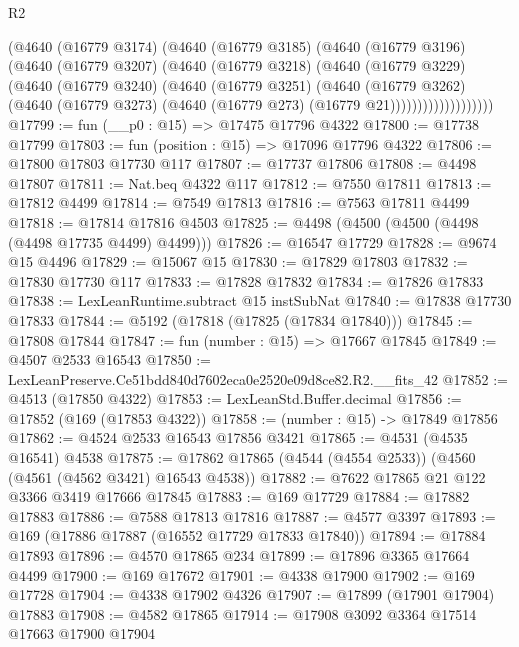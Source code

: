 \begin{lexlean}{R2}
\begin{coremodule}
                  (@4640
                    (@16779 @3174)
                    (@4640
                      (@16779 @3185)
                      (@4640
                        (@16779 @3196)
                        (@4640
                          (@16779 @3207)
                          (@4640
                            (@16779 @3218)
                            (@4640
                              (@16779 @3229)
                              (@4640
                                (@16779 @3240)
                                (@4640
                                  (@16779 @3251)
                                  (@4640
                                    (@16779 @3262)
                                    (@4640
                                      (@16779 @3273)
                                      (@4640 (@16779 @273) (@16779 @21)))))))))))))))))))
@17799 := fun (__p0 : @15) => @17475 @17796 @4322
@17800 := @17738 @17799
@17803 := fun (position : @15) => @17096 @17796 @4322
@17806 := @17800 @17803 @17730 @117
@17807 := @17737 @17806
@17808 := @4498 @17807
@17811 := Nat.beq @4322 @117
@17812 := @7550 @17811
@17813 := @17812 @4499
@17814 := @7549 @17813
@17816 := @7563 @17811 @4499
@17818 := @17814 @17816 @4503
@17825 := @4498 (@4500 (@4500 (@4498 (@4498 @17735 @4499) @4499)))
@17826 := @16547 @17729
@17828 := @9674 @15 @4496
@17829 := @15067 @15
@17830 := @17829 @17803
@17832 := @17830 @17730 @117
@17833 := @17828 @17832
@17834 := @17826 @17833
@17838 := LexLeanRuntime.subtract @15 instSubNat
@17840 := @17838 @17730 @17833
@17844 := @5192 (@17818 (@17825 (@17834 @17840)))
@17845 := @17808 @17844
@17847 := fun (number : @15) => @17667 @17845
@17849 := @4507 @2533 @16543
@17850 := LexLeanPreserve.Ce51bdd840d7602eca0e2520e09d8ce82.R2.__fits_42
@17852 := @4513 (@17850 @4322)
@17853 := LexLeanStd.Buffer.decimal
@17856 := @17852 (@169 (@17853 @4322))
@17858 := (number : @15) -> @17849 @17856
@17862 := @4524 @2533 @16543 @17856 @3421
@17865 := @4531 (@4535 @16541) @4538
@17875 := @17862 @17865 (@4544 (@4554 @2533)) (@4560 (@4561 (@4562 @3421) @16543 @4538))
@17882 := @7622 @17865 @21 @122 @3366 @3419 @17666 @17845
@17883 := @169 @17729
@17884 := @17882 @17883
@17886 := @7588 @17813 @17816
@17887 := @4577 @3397
@17893 := @169 (@17886 @17887 (@16552 @17729 @17833 @17840))
@17894 := @17884 @17893
@17896 := @4570 @17865 @234
@17899 := @17896 @3365 @17664 @4499
@17900 := @169 @17672
@17901 := @4338 @17900
@17902 := @169 @17728
@17904 := @4338 @17902 @4326
@17907 := @17899 (@17901 @17904) @17883
@17908 := @4582 @17865
@17914 := @17908 @3092 @3364 @17514 @17663 @17900 @17904

\end{coremodule}
\end{lexlean}
